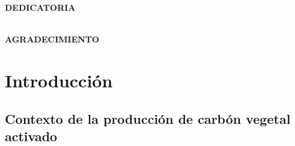 \documentclass[12pt,a4paper,oneside]{book}
\begin{document}

\begin{titlepage}

\begin{flushright}
{\large \bf DEDICATORIA}
\\
\textit{}
\\
\textit{} %
\end{flushright}
\end{titlepage}


\begin{titlepage}

\begin{flushright}
{\large \bf AGRADECIMIENTO}
\\
\textit{}
{} %
\end{flushright}
\end{titlepage}



\tableofcontents
\cleardoublepage
\listoftables
\listoffigures 
\newpage






\chapter{Introducción}

\section{Contexto de la producción de carbón vegetal activado}
\end{document}
